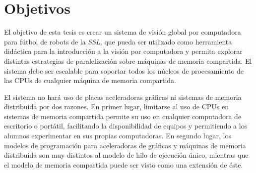 
\section{Objetivos}

\label{objetivos}

El objetivo de esta tesis es crear un sistema de visión global por computadora
para fútbol de robots de la \emph{SSL}, que pueda ser utilizado como herramienta
didáctica para la introducción a la visión por computadora y permita explorar
distintas estrategias de paralelización sobre máquinas de memoria compartida. El
sistema debe ser escalable para soportar todos los núcleos de procesamiento de
las CPUs de cualquier máquina de memoria compartida.

El sistema no hará uso de placas aceleradoras gráficas ni sistemas de memoria distribuida
por dos razones. En primer lugar, limitarse al uso de CPUs en sistemas de
memoria compartida permite su uso en cualquier computadora de escritorio o
portátil, facilitando la disponibilidad de equipos y permitiendo a los alumnos
experimentar en sus propias computadoras. En segundo lugar, los modelos de
programación para aceleradoras de gráficas y máquinas de memoria distribuida son
muy distintos al modelo de hilo de ejecución único, mientras que el modelo de
memoria compartida puede ser visto como una extensión de éste.
